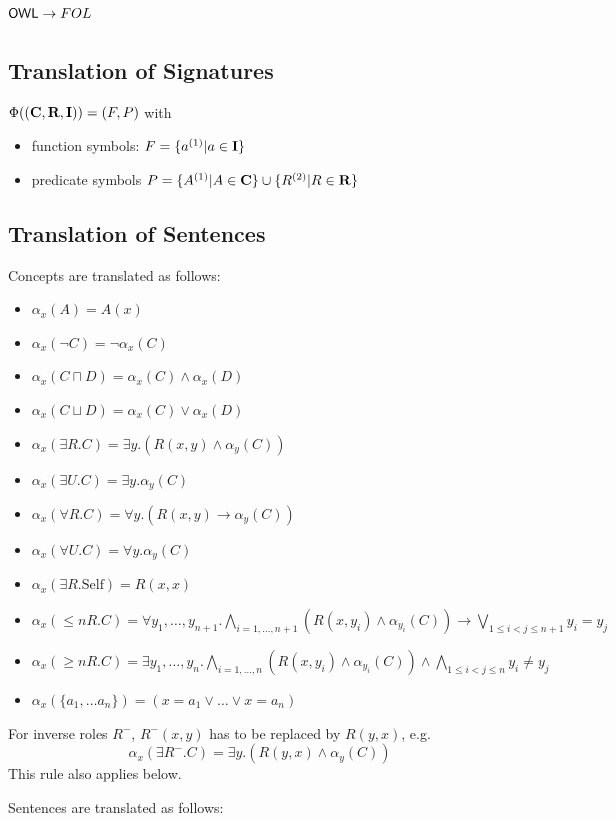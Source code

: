 \documentclass[10pt,fleqn,%
\ifpretendfinal
final%
\else
draft%
\fi,
]{scrreprt}
\newcommand{\sclause}[1]{\section{#1}}
\newcommand{\ssclause}[1]{\subsection{#1}}
\begin{document}
\sclause{$\mathsf{OWL} \rightarrow FOL$}

\ssclause{Translation of Signatures}

 $\Phi((\textbf{C}, \textbf{R}, \textbf{I})) =  (F, P)$ with
\begin{itemize}
	\item function symbols: $F = \{a^{(1)} \vert a \in \textbf{I}\}$
	\item predicate symbols $P = \{A^{(1)} \vert A \in \mathbf{C} \} \cup \{ R^{(2)} \vert R \in \mathbf{R}\}$
\end{itemize}


\ssclause{Translation of Sentences}

Concepts are translated as follows:
\begin{itemize}
 \item $\alpha_x(A) = A(x)$
 \item $\alpha_x(\lnot C) = \lnot \alpha_x (C)$
 \item $\alpha_x(C \sqcap D) = \alpha_x(C) \land \alpha_x(D)$
 \item $\alpha_x(C \sqcup D) = \alpha_x(C) \lor \alpha_x(D)$ 
 \item $\alpha_x(\exists R.C) = \exists y . (R(x,y) \land \alpha_y(C))$
 \item $\alpha_x(\exists U.C) = \exists y . \alpha_y(C)$
 \item $\alpha_x(\forall R.C) = \forall y . (R(x,y) \rightarrow \alpha_y(C))$
 \item $\alpha_x(\forall U.C) = \forall y . \alpha_y(C)$
 \item $\alpha_x(\exists R.\text{Self}) = R(x,x)$
 \item $\alpha_x(\leq n R. C) = \forall y_1,\ldots,y_{n+1} .  \bigwedge_{i=1,\ldots,n+1}(R(x,y_i) \land \alpha_{y_i}(C)) \rightarrow\bigvee_{1\leq i<j\leq n+1}y_i = y_j$
 \item $\alpha_x(\geq n R. C) = \exists y_1,\ldots,y_n . \bigwedge_{i=1,\ldots,n}(R(x,y_i) \land \alpha_{y_i}(C)) \wedge \bigwedge_{1\leq i<j\leq n}y_i\not= y_j $
 \item $\alpha_x(\{a_1, \ldots a_n \}) = (x=a_1\vee \ldots \vee x=a_n)$
\end{itemize}

For inverse roles $R^-$, $R^-(x,y)$ has to be replaced by $R(y,x)$, e.g.
 $$\alpha_x(\exists R^-.C) = \exists y . (R(y,x) \land \alpha_y(C))$$
This rule also applies below.


Sentences are translated as follows:
\end{document}
